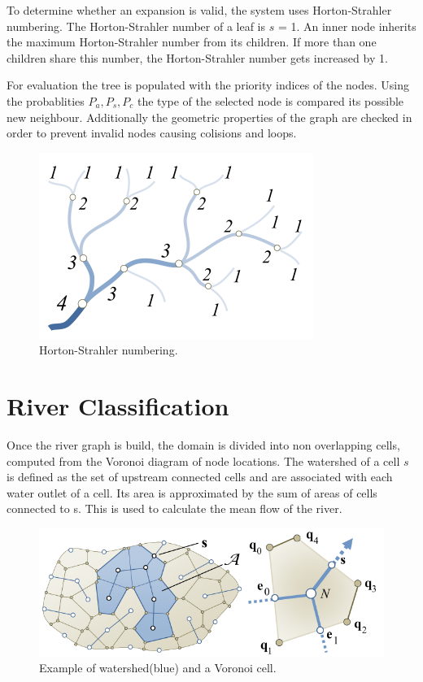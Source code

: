 To determine whether an expansion is valid, the system uses Horton-Strahler numbering. The Horton-Strahler number of a leaf  is $s$ = 1. An inner node inherits the maximum Horton-Strahler number from its children. If more than one children share this number, the Horton-Strahler number gets increased by 1.

For evaluation the tree is populated with the priority indices of the nodes. Using the probablities $P_a, P_s, P_c$ the type of the selected node is compared its possible new neighbour. Additionally the geometric properties of the graph are checked in order to prevent invalid nodes causing colisions and loops.  
\begin{figure}[htb]
	\centering
	\includegraphics[width=0.5\linewidth]{GGG13/horton-strahler}
	\caption{Horton-Strahler numbering.}
	\label{fig:horton_strahler}
\end{figure}

\section{River Classification}
Once the river graph is build, the domain is divided into non overlapping cells, computed from the Voronoi diagram of node locations.  
The watershed of a cell $s$ is defined as the set of upstream connected cells and are associated with each water outlet of a cell. Its area is approximated by the sum of areas of cells connected to s. This is used to calculate the mean flow of the river. 

\begin{figure}[htb]
	\centering
	\includegraphics[width=\linewidth]{GGG13/voronoi_watershed}
	\caption{Example of watershed(blue) and a Voronoi cell.}
	\label{fig:voronoi_watershed}
\end{figure}

